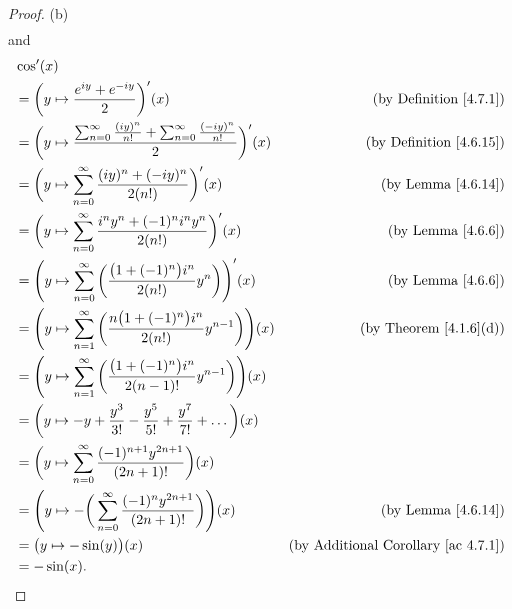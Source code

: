 \begin{proof}{(b)}
\begin{align*}
    \end{align*}
    and
    \begin{align*}
         & \cos'(x)                                                                                                                                                                  \\
         & = \bigg(y \mapsto \frac{e^{i y} + e^{- i y}}{2}\bigg)'(x)                                                               & \text{(by Definition \ref{4.7.1})}              \\
         & = \bigg(y \mapsto \frac{\sum_{n = 0}^\infty \frac{(i y)^n}{n!} + \sum_{n = 0}^\infty \frac{(- i y)^n}{n!}}{2}\bigg)'(x) & \text{(by Definition \ref{4.6.15})}             \\
         & = \bigg(y \mapsto \sum_{n = 0}^\infty \frac{(i y)^n + (- i y)^n}{2 (n!)}\bigg)'(x)                                      & \text{(by Lemma \ref{4.6.14})}                  \\
         & = \bigg(y \mapsto \sum_{n = 0}^\infty \frac{i^n y^n + (-1)^n i^n y^n}{2 (n!)}\bigg)'(x)                                 & \text{(by Lemma \ref{4.6.6})}                   \\
         & = \Bigg(y \mapsto \sum_{n = 0}^\infty \bigg(\frac{\big(1 + (-1)^n\big) i^n}{2 (n!)} y^n\bigg)\Bigg)'(x)                 & \text{(by Lemma \ref{4.6.6})}                   \\
         & = \Bigg(y \mapsto \sum_{n = 1}^\infty \bigg(\frac{n \big(1 + (-1)^n\big) i^n}{2 (n!)} y^{n - 1}\bigg)\Bigg)(x)          & \text{(by Theorem \ref{4.1.6}(d))}              \\
         & = \Bigg(y \mapsto \sum_{n = 1}^\infty \bigg(\frac{\big(1 + (-1)^n\big) i^n}{2 (n - 1)!} y^{n - 1}\bigg)\Bigg)(x)                                                          \\
         & = \bigg(y \mapsto -y + \frac{y^3}{3!} - \frac{y^5}{5!} + \frac{y^7}{7!} + \dots\bigg)(x)                                                                                  \\
         & = \bigg(y \mapsto \sum_{n = 0}^\infty \frac{(-1)^{n + 1} y^{2n + 1}}{(2n + 1)!}\bigg)(x)                                                                                  \\
         & = \Bigg(y \mapsto -\bigg(\sum_{n = 0}^\infty \frac{(-1)^n y^{2n + 1}}{(2n + 1)!}\bigg)\Bigg)(x)                         & \text{(by Lemma \ref{4.6.14})}                  \\
         & = \big(y \mapsto -\sin(y)\big)(x)                                                                                       & \text{(by Additional Corollary \ref{ac 4.7.1})} \\
         & = -\sin(x).
    \end{align*}
\end{proof}

